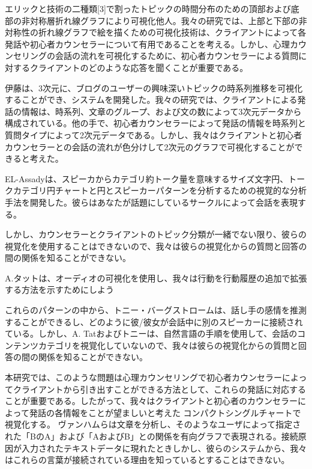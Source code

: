\documentclass[shuuron]{kuee}
\begin{document}
  エリックと技術の二種類[3]で割ったトピックの時間分布のための頂部および底部の非対称層折れ線グラフにより可視化他人。我々の研究では、上部と下部の非対称性の折れ線グラフで絵を描くための可視化技術は、クライアントによって各発話や初心者カウンセラーについて有用であることを考える。しかし、心理カウンセリングの会話の流れを可視化するために、初心者カウンセラーによる質問に対するクライアントのどのような応答を聞くことが重要である。

  伊藤\cite{itoh2010interactive}は、3次元に、ブログのユーザーの興味深いトピックの時系列推移を可視化することができ、システムを開発した。我々の研究では、クライアントによる発話の情報は、時系列、文章のグループ、および文の数によって3次元データから構成されている。他の手で、初心者カウンセラーによって発話の情報を時系列と質問タイプによって2次元データである。しかし、我々はクライアントと初心者カウンセラーとの会話の流れが色分けして2次元のグラフで可視化することができると考えた。

   EL-Assady\cite{el2016contovi}は、スピーカからカテゴリ約トーク量を意味するサイズ文字円、トークカテゴリ円チャートと円とスピーカーパターンを分析するための視覚的な分析手法を開発した。彼らはあなたが話題にしているサークルによって会話を表現する。

しかし、カウンセラーとクライアントのトピック分類が一緒でない限り、彼らの視覚化を使用することはできないので、我々は彼らの視覚化からの質問と回答の間の関係を知ることができない。

  A.タット\cite{tat2002visualising}は、オーディオの可視化を使用し、我々は行動を行動履歴の追加で拡張する方法を示すためにしよう

 これらのパターンの中から、トニー・バーグストローム\cite{bergstrom2007seeing}は、話し手の感情を推測することができるし、どのように彼/彼女が会話中に別のスピーカーに接続されている。しかし、A. Tatおよびトニーは、自然言語の手順を使用して、会話のコンテンツカテゴリを視覚化していないので、我々は彼らの視覚化からの質問と回答の間の関係を知ることができない。

  本研究では、このような問題は心理カウンセリングで初心者カウンセラーによってクライアントから引き出すことができる方法として、これらの発話に対応することが重要である。したがって、我々はクライアントと初心者のカウンセラーによって発話の各情報をことが望ましいと考えた コンパクトシングルチャートで視覚化する。
  ヴァンハムら\cite{van2009mapping}は文章を分析し、そのようなユーザによって指定された「BのA」および「AおよびB」との関係を有向グラフで表現される。接続原因が入力されたテキストデータに現れたときしかし、彼らのシステムから、我々はこれらの言葉が接続されている理由を知っているとすることはできない。
\end{document}
